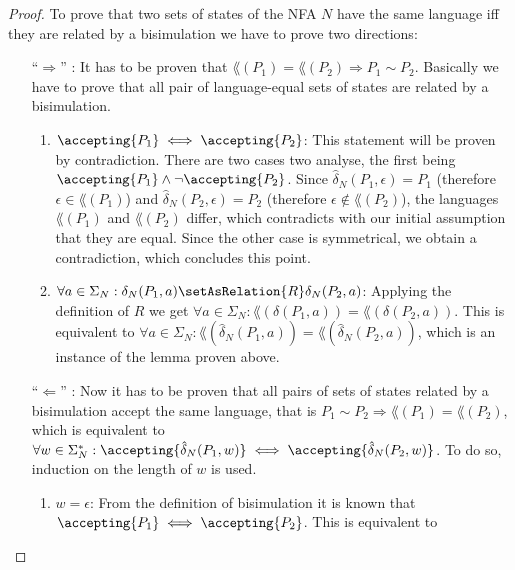 \begin{proof}
  To prove that two sets of states of the NFA $N$ have the same language
    iff they are related by a bisimulation we have to prove two directions:
  \begin{enumerate}
    \item[``$\Rightarrow$'']:
      It has to be proven that
        $\lang(P_1) = \lang(P_2) \Rightarrow P_1 \sim P_2$.
        Basically we have to prove that all pair of language-equal sets of
          states are related by a bisimulation.
      \begin{enumerate}
        \item $\accepting{P_1} \iff \accepting{P_2}$:
          This statement will be proven by contradiction.
          There are two cases two analyse, the first being
            $\accepting{P_1} \land \lnot \accepting{P_2}$.
          Since
            $\hat{\delta}_N(P_1, \epsilon) = P_1$ (therefore $\epsilon \in \lang(P_1)$) and
            $\hat{\delta}_N(P_2, \epsilon) = P_2$ (therefore $\epsilon \notin \lang(P_2)$),
            the languages $\lang(P_1)$ and $\lang(P_2)$ differ, which contradicts with
            our initial assumption that they are equal.
          Since the other case is symmetrical, we obtain a contradiction,
            which concludes this point.
        \item $\forall a \in \Sigma_N: \delta_N(P_1, a) \setAsRelation{R} \delta_N(P_2, a)$:
          Applying the definition of $R$ we get
            $\forall a \in \Sigma_N: \lang(\delta(P_1, a)) = \lang(\delta(P_2, a))$.
          This is equivalent to
            $\forall a \in \Sigma_N: \lang(\hat{\delta}_N(P_1, a)) = \lang(\hat{\delta}_N(P_2, a))$,
            which is an instance of the lemma proven above.
      \end{enumerate}
    \item[``$\Leftarrow$'']:
      Now it has to be proven that all pairs of sets of states related by a
        bisimulation accept the same language, that is
        $P_1 \sim P_2 \Rightarrow \lang(P_1) = \lang(P_2)$,
        which is equivalent to
        $\forall w \in \Sigma_N^\ast:
          \accepting{\hat{\delta}_N(P_1, w)} \iff \accepting{\hat{\delta}_N(P_2, w)}$.
      To do so, induction on the length of $w$ is used.
      \begin{enumerate}
        \item $w = \epsilon$: From the definition of bisimulation it is known
            that $\accepting{P_1} \iff \accepting{P_2}$.
          This is equivalent to

\end{enumerate}
\end{enumerate}
\end{proof}
